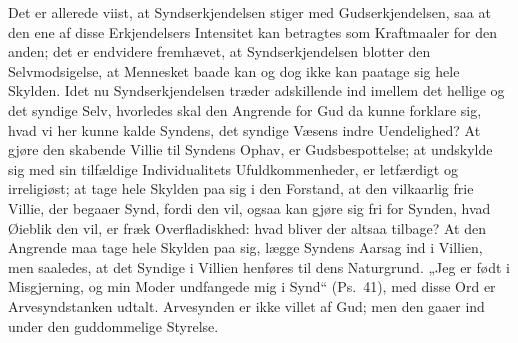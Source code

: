\documentclass[12pt]{book}
\begin{document}
Det er allerede viist, at Syndserkjendelsen stiger med
Gudserkjendelsen, saa at den ene af disse Erkjendelsers Intensitet
kan betragtes som Kraftmaaler for den anden; det er endvidere
fremhævet, at Syndserkjendelsen blotter den Selvmodsigelse, at
Mennesket baade kan og dog ikke kan paatage sig hele Skylden. Idet
nu Syndserkjendelsen træder adskillende ind imellem det hellige og
det syndige Selv, hvorledes skal den Angrende for Gud da kunne
forklare sig, hvad vi her kunne kalde Syndens, det syndige Væsens
indre Uendelighed? At gjøre den skabende Villie til Syndens Ophav,
er Gudsbespottelse; at undskylde sig med sin tilfældige
Individualitets Ufuldkommenheder, er letfærdigt og irreligiøst; at
tage hele Skylden paa sig i den Forstand, at den vilkaarlig frie
Villie, der begaaer Synd, fordi den vil, ogsaa kan gjøre sig fri for
Synden, hvad Øieblik den vil, er fræk Overfladiskhed: hvad bliver
der altsaa tilbage? At den Angrende maa tage hele Skylden paa sig,
lægge Syndens Aarsag ind i Villien,
men saaledes, at det Syndige i Villien henføres til dens Naturgrund.
„Jeg er født i Misgjerning, og min Moder undfangede mig i Synd“
(Ps.\ 41), med disse Ord er Arvesyndstanken udtalt. Arvesynden er
ikke villet af Gud; men den gaaer ind under den guddommelige
Styrelse.
\end{document}
